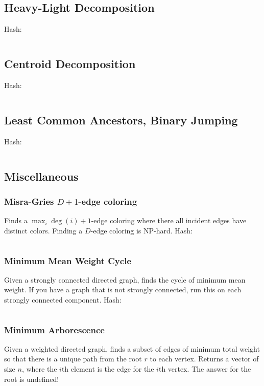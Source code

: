 \documentclass[9pt,a4paper,landscape,oneside]{amsart}
\newcommand{\mintedstyle}[2]{\inputminted{#1}{code/#2}}
\newcommand{\code}[1]{ Hash: 
\mintedstyle{cpp}{#1}}
\begin{document}
\begin{multicols*}{3}
\subsection{Heavy-Light Decomposition}
\code{graphs/hld.cpp}

\subsection{Centroid Decomposition}
\code{graphs/centroid_decomposition.cpp}

\subsection{Least Common Ancestors, Binary Jumping}
\code{graphs/lca.cpp}


\subsection{Miscellaneous}

\subsubsection{Misra-Gries $D+1$-edge coloring}
Finds a $\max_i \deg(i) + 1$-edge coloring where there all incident edges have distinct colors.
Finding a $D$-edge coloring is NP-hard.
\code{graphs/MisraGries.cpp}

\subsubsection{Minimum Mean Weight Cycle}
Given a strongly connected directed graph, finds the cycle of minimum
mean weight. If you have a graph that is not strongly connected, run
this on each strongly connected component.
\code{graphs/min_mean_cycle.cpp}

\subsubsection{Minimum Arborescence}
Given a weighted directed graph, finds a subset of edges of minimum
total weight so that there is a unique path from the root $r$ to each
vertex. Returns a vector of size $n$, where the $i$th element is the
edge for the $i$th vertex. The answer for the root is undefined!


\end{multicols*}
\end{document}
